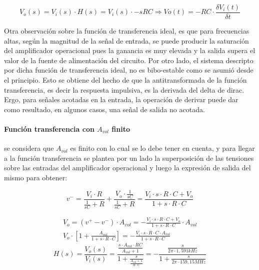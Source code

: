 \begin{equation*}
	V_o(s) = V_i(s) \cdot H(s) = V_i(s) \cdot -sRC \Rightarrow
	Vo(t) = -RC \cdot \frac{\delta V_i(t)}{\delta t}
\end{equation*}

Otra observaci\'on sobre la funci\'on de transferencia ideal, es que para frecuencias altas, 
seg\'un la magnitud de la se\~nal de entrada, se puede producir la saturaci\'on del amplificador
operacional pues la ganancia es muy elevada y la salida supera el valor de la fuente de 
alimentaci\'on del circuito. Por otro lado, el sistema descripto por dicha funci\'on de 
transferencia ideal, no es bibo-estable como se asumi\'o desde el principio. 
Esto se obtiene del hecho de que la antitransformada de la funci\'on transferencia, es decir la respuesta impulsiva, 
es la derivada del delta de dirac. Ergo, para se\~nales acotadas en la entrada, la operaci\'on de derivar
puede dar como resultado, en algunos casos, una se\~nal de salida no acotada.


\paragraph*{Funci\'on transferencia con $A_{vol}$ finito}se considera que $A_{vol}$ es finito con lo cual se lo debe tener en cuenta, y para llegar a la funci\'on transferencia se plantea por un lado la superposici\'on de las tensiones sobre las entradas del amplificador operacional y luego la expresi\'on de salida del mismo para obtener:

\begin{equation*}
	v^{-} = \frac{V_i \cdot R}{\frac{1}{sC} + R} + \frac{V_o \cdot \frac{1}{sC}}{\frac{1}{sC} + R}
	= \frac{V_i \cdot s \cdot R \cdot C + V_o}{1 + s \cdot R \cdot C}
\end{equation*}

\begin{align*}
	V_o = (v^{+} - v^{-}) \cdot A_{vol}
	= - \frac{V_i \cdot s \cdot R \cdot C + V_o}{1 + s \cdot R \cdot C} \cdot A_{vol} \\
	V_o \cdot \left[ 1 + \frac{A_{vol}}{1 + s \cdot R \cdot C} \right]
	= - \frac{V_i \cdot s \cdot R \cdot C \cdot A_{vol}}{1 + s \cdot R \cdot C}
\end{align*}
\begin{equation}
	H(s) = \frac{V_o(s)}{V_i(s)} = \frac{\frac{s \cdot A_{vol} \cdot RC}{A_{vol} + 1}}{1 + \frac{s}{\frac{A_{vol} + 1}{R \cdot C}}}
	= - \frac{\frac{s}{2 \pi \cdot 1,591kHz}}{1 + \frac{s}{2 \pi \cdot 159,15MHz}}
	\label{eq:derivador_transfer_avol_finito}
\end{equation}

